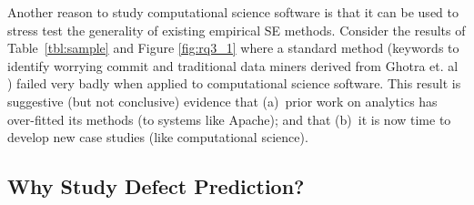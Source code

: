 \documentclass[10pt,journal,compsoc]{IEEEtran}
\newcommand{\tbl}[1]{Table~\ref{tbl:#1}}
\begin{document}


Another reason to study   computational science software  is that it can  be used to stress test
the generality of existing empirical SE methods.
Consider the results of \tbl{sample} and Figure \ref{fig:rq3_1} where a standard method  (keywords to identify worrying commit and traditional data miners derived from Ghotra et. al \cite{ghotra15}) failed very badly
when applied to computational science software.
This result is suggestive (but not conclusive) evidence that (a)~prior work on analytics has over-fitted
its methods (to systems like Apache);  and that (b)~it is 
now time to develop new case studies (like computational science).



\subsection{Why Study Defect Prediction?}

  
\end{document}
